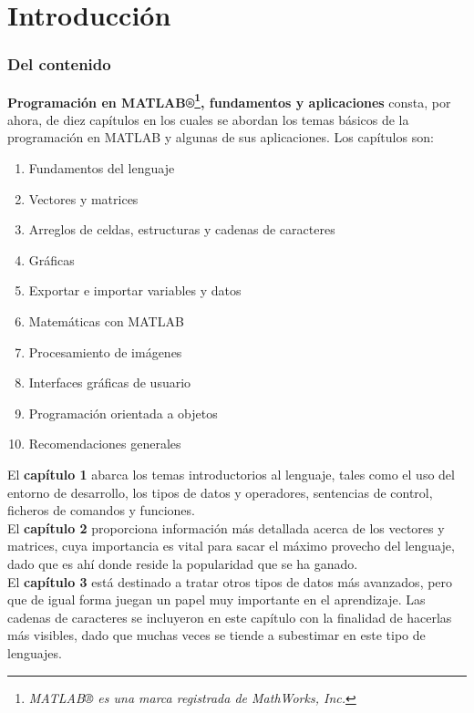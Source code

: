 \chapter*{Introducción}

\subsection*{Del contenido}

\textbf{Programación en MATLAB®\footnote{\emph{MATLAB® es una marca
  registrada de MathWorks, Inc.}}, fundamentos y aplicaciones} consta,
por ahora, de diez capítulos en los cuales se abordan los temas básicos
de la programación en MATLAB y algunas de sus aplicaciones. Los
capítulos son:

\begin{enumerate}
\item Fundamentos del lenguaje
\item Vectores y matrices
\item Arreglos de celdas, estructuras y cadenas de caracteres
\item Gráficas
\item Exportar e importar variables y datos
\item Matemáticas con MATLAB
\item Procesamiento de imágenes
\item Interfaces gráficas de usuario
\item Programación orientada a objetos
\item Recomendaciones generales
\end{enumerate}

El \textbf{capítulo 1} abarca los temas introductorios al lenguaje,
tales como el uso del entorno de desarrollo, los tipos de datos y
operadores, sentencias de control, ficheros de comandos y funciones. \\

El \textbf{capítulo 2} proporciona información más detallada acerca de
los vectores y matrices, cuya importancia es vital para sacar el máximo
provecho del lenguaje, dado que es ahí donde reside la popularidad que
se ha ganado. \\

El \textbf{capítulo 3} está destinado a tratar otros tipos de datos más
avanzados, pero que de igual forma juegan un papel muy importante en el
aprendizaje. Las cadenas de caracteres se incluyeron en este capítulo
con la finalidad de hacerlas más visibles, dado que muchas veces se
tiende a subestimar en este tipo de lenguajes. \\

